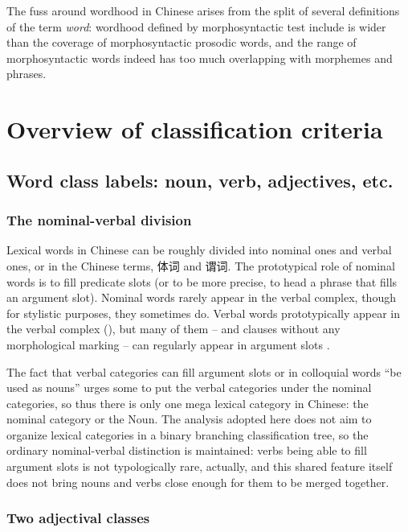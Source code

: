 \documentclass[UTF8, a4paper, oneside, scheme=plain]{ctexrep}
\newcommand*{\citesec}[1]{\S~{#1}}
\newcommand*{\term}[1]{\emph{#1}}
\begin{document}
The fuss around wordhood in Chinese 
arises from the split of several definitions of the term \term{word}:
wordhood defined by morphosyntactic test include is wider 
than the coverage of morphosyntactic prosodic words,
and the range of morphosyntactic words indeed 
has too much overlapping with morphemes and phrases.

\section{Overview of classification criteria}

\subsection{Word class labels: noun, verb, adjectives, etc.}

\subsubsection{The nominal-verbal division}

Lexical words in Chinese can be roughly divided into nominal ones and verbal ones,
or in the Chinese terms, 体词 and 谓词.
The prototypical role of nominal words 
is to fill predicate slots (or to be more precise, to head a phrase that fills an argument slot).
Nominal words rarely appear in the verbal complex,
though for stylistic purposes, they sometimes do.
Verbal words prototypically appear in the verbal complex
(),
but many of them -- and clauses without any morphological marking -- 
can regularly appear in argument slots \citep[\citesec{3.5}]{zhudexigrammar}.

The fact that verbal categories can fill argument slots or in colloquial words ``be used as nouns''
urges some to put the verbal categories under the nominal categories,
so thus there is only one mega lexical category in Chinese:
the nominal category or the Noun.
The analysis adopted here does not aim to organize lexical categories 
in a binary branching classification tree,
so the ordinary nominal-verbal distinction is maintained:
verbs being able to fill argument slots is not typologically rare, actually,
and this shared feature itself does not bring nouns and verbs close enough 
for them to be merged together.

\subsubsection{Two adjectival classes}
\end{document}
